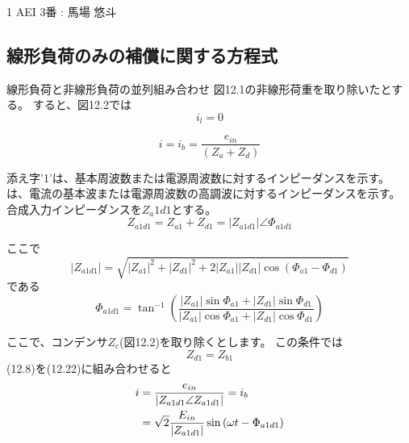 \documentclass[fleqn,11pt,a4paper,dvipdfmx]{jsarticle}
\numberwithin{equation}{section}
\begin{document}
%
%
1 AEI 3番 : 馬場 悠斗
\setcounter{section}{12}
\subsection{線形負荷のみの補償に関する方程式}

線形負荷と非線形負荷の並列組み合わせ
図12.1の非線形荷重を取り除いたとする。
すると、図12.2では
\begin{equation}
  i_l = 0
\end{equation}

\begin{equation}
  i = i_b = \frac{e_{in}}{\left(Z_a + Z_d\right)}
\end{equation}

添え字'1'は、基本周波数または電源周波数に対するインピーダンスを示す。
は、電流の基本波または電源周波数の高調波に対するインピーダンスを示す。
合成入力インピーダンスを$Z_a1d1$とする。
\begin{equation}
  Z_{a1d1} = Z_{a1} + Z_{d1} = |Z_{a1d1}| \angle \Phi_{a1d1}
\end{equation}

ここで
\begin{equation}
  |Z_{a1d1}| = \sqrt{|Z_{a1}|^2 + |Z_{d1}|^2 + 2|Z_{a1}||Z_{d1}| \cos \left(\Phi_{a1} - \Phi_{d1}\right) }
\end{equation}
である
\begin{equation}
  \Phi_{a1d1} = \tan^{-1}\left( \frac{\left| Z_{a1} \right| \sin \Phi_{a1} + \left| Z_{d1} \right| \sin \Phi_{d1} }{\left| Z_{a1} \right| \cos \Phi_{a1} + \left| Z_{d1} \right| \cos \Phi_{d1}}\right)
\end{equation}

ここで、コンデンサ$Z_c$(図12.2)を取り除くとします。
この条件では
\begin{equation}
  Z_{d1} = Z_{b1}
\end{equation}
(12.8)を(12.22)に組み合わせると
\begin{align}
  i & = \frac{e_{in}}{\left| Z_{a1d1}\angle Z_{a1d1} \right|} = i_b \notag                     \\
    & = \sqrt{2} \frac{E_{in}}{\left|Z_{a1d1}\right|} \sin \left(\omega t - \Phi_{a1d1}\right)
\end{align}
\end{document}
